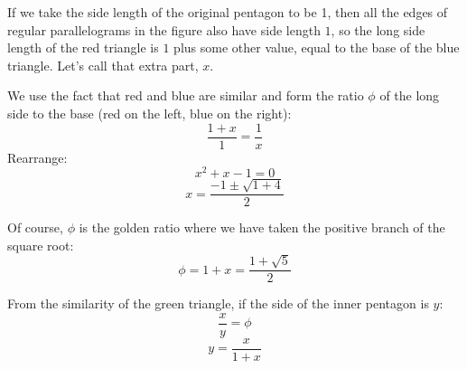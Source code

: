 \documentclass[11pt, oneside]{article}
\begin{document}
If we take the side length of the original pentagon to be 1, then all the edges of regular parallelograms in the figure also have side length $1$, so the long side length of the red triangle is $1$ plus some other value, equal to the base of the blue triangle.  Let's call that extra part, $x$.  

We use the fact that red and blue are similar and form the ratio $\phi$ of the long side to the base (red on the left, blue on the right):
\[ \frac{1 + x}{1} = \frac{1}{x} \]
Rearrange:
\[ x^2 + x - 1 = 0 \]
\[ x = \frac{-1 \pm \sqrt{1 + 4}}{2} \]

Of course, $\phi$ is the golden ratio where we have taken the positive branch of the square root:
\[ \phi = 1 + x = \frac{1 + \sqrt{5}}{2} \]

From the similarity of the green triangle, if the side of the inner pentagon is $y$:
\[ \frac{x}{y} = \phi \]
\[ y = \frac{x}{1+x}  \]
\end{document}
